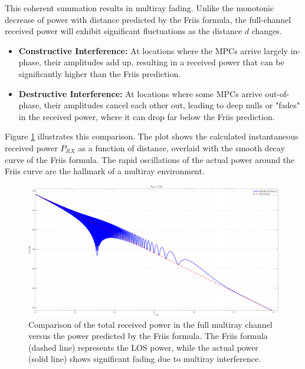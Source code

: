This coherent summation results in multiray fading. Unlike the monotonic decrease of power with distance predicted by the Friis formula, the full-channel received power will exhibit significant fluctuations as the distance $d$ changes.
\begin{itemize}
	\item \textbf{Constructive Interference:} At locations where the MPCs arrive largely in-phase, their amplitudes add up, resulting in a received power that can be significantly higher than the Friis prediction.
	\item \textbf{Destructive Interference:} At locations where some MPCs arrive out-of-phase, their amplitudes cancel each other out, leading to deep nulls or "fades" in the received power, where it can drop far below the Friis prediction.
\end{itemize}
Figure \ref{fig:prx_vs_friis} illustrates this comparison. The plot shows the calculated instantaneous received power $P_{RX}$ as a function of distance, overlaid with the smooth decay curve of the Friis formula. The rapid oscillations of the actual power around the Friis curve are the hallmark of a multiray environment.

\begin{figure}[h!]
	\centering
	\includegraphics[width=0.9\linewidth]{content/4-images/prx_vs_friis_placeholder.png} %
	\caption{Comparison of the total received power in the full multiray channel versus the power predicted by the Friis formula. The Friis formula (dashed line) represents the LOS power, while the actual power (solid line) shows significant fading due to multiray interference.}
	\label{fig:prx_vs_friis}
\end{figure}

